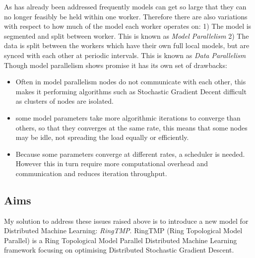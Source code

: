 As has already been addressed frequently models can get so large that they can
no longer feasibly be held within one worker. Therefore there are also
variations with respect to how much of the model each worker operates on: 1) The
model is segmented and split between worker. This is known as \textit{Model Parallelism} 
2) The data is split between the workers which have their own full
local models, but are synced with each other at periodic intervals. This is
known as \textit{Data Parallelism} \cite{Xing2015Petuum} Though model
parallelism shows promise it has its own set of drawbacks:
\begin{itemize}
    \item Often in model parallelism nodes do not communicate with each other,
    this makes it performing algorithms such as Stochastic Gradient Decent
    difficult as clusters of nodes are isolated.
    \item some model parameters take more algorithmic iterations to converge
    than others, so that they converges at the same rate,
    this means that some nodes may be idle, not spreading the load equally or
    efficiently. \cite{Dean2012Distbelief}
    \item Because some parameters converge at different rates, a scheduler is
    needed. However this in turn require more computational overhead and
    communication and reduces iteration throughput. \cite{kim2016STRADS}
\end{itemize}

\subsection{Aims}
My solution to address these issues raised above is to introduce a new model for
Distributed Machine Learning: \textit{RingTMP}. RingTMP (Ring Topological Model
Parallel) is a Ring Topological Model Parallel Distributed Machine Learning
framework focusing on optimising Distributed Stochastic Gradient Descent.
\par

